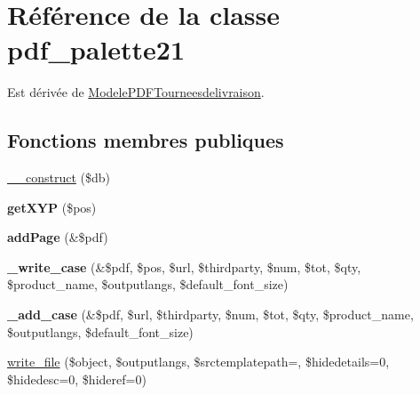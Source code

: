 \hypertarget{classpdf__palette21}{}\section{Référence de la classe pdf\+\_\+palette21}
\label{classpdf__palette21}


Est dérivée de \hyperlink{classModelePDFTourneesdelivraison}{Modele\+P\+D\+F\+Tourneesdelivraison}.

\subsection*{Fonctions membres publiques}
\begin{DoxyCompactItemize}
\item 
\hyperlink{classpdf__palette21_aa3d8ae4b8658568ea0598461289322c8}{\+\_\+\+\_\+construct} (\$db)
\item 
\mbox{\label{classpdf__palette21_a0088752bd3f56313311675bfe938ef77}} 
{\bfseries get\+X\+YP} (\$pos)
\item 
\mbox{\label{classpdf__palette21_a05f7e210f320e9fc10814d731f6f4eae}} 
{\bfseries add\+Page} (\&\$pdf)
\item 
\mbox{\label{classpdf__palette21_af1d4dafd00e522edb19d43e85957c609}} 
{\bfseries \+\_\+write\+\_\+case} (\&\$pdf, \$pos, \$url, \$thirdparty, \$num, \$tot, \$qty, \$product\+\_\+name, \$outputlangs, \$default\+\_\+font\+\_\+size)
\item 
\mbox{\label{classpdf__palette21_aabcad4815dabe0d18d3a36d815255c48}} 
{\bfseries \+\_\+add\+\_\+case} (\&\$pdf, \$url, \$thirdparty, \$num, \$tot, \$qty, \$product\+\_\+name, \$outputlangs, \$default\+\_\+font\+\_\+size)
\item 
\hyperlink{classpdf__palette21_a306668bd961b99bc29e9c45c3323f92c}{write\+\_\+file} (\$object, \$outputlangs, \$srctemplatepath=\textquotesingle{}\textquotesingle{}, \$hidedetails=0, \$hidedesc=0, \$hideref=0)
\end{DoxyCompactItemize}
